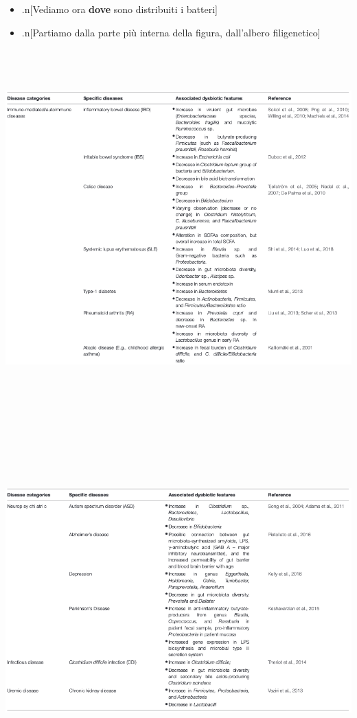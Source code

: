 \documentclass[
]{article}
\begin{document}
\begin{itemize}
\item
  .n{[}Vediamo ora \textbf{dove} sono distribuiti i batteri{]}
\item
  .n{[}Partiamo dalla parte più interna della figura, dall'albero
  filigenetico{]}
\end{itemize}

\begin{center}\includegraphics[width=800px,height=520px]{images/KhoPaperT3-1} \end{center}

\begin{center}\includegraphics[width=900px,height=530px]{images/KhoPaperT3-3} \end{center}
\end{document}
